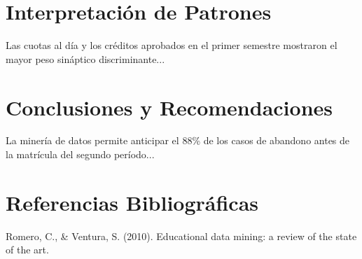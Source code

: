 \documentclass[11pt,a4paper]{article}
\begin{document}
\section{Interpretación de Patrones}
Las cuotas al día y los créditos aprobados en el primer semestre mostraron el mayor peso sináptico discriminante...
\section{Conclusiones y Recomendaciones}
La minería de datos permite anticipar el 88\% de los casos de abandono antes de la matrícula del segundo período...
\section{Referencias Bibliográficas}
Romero, C., \& Ventura, S. (2010). Educational data mining: a review of the state of the art.
\end{document}
